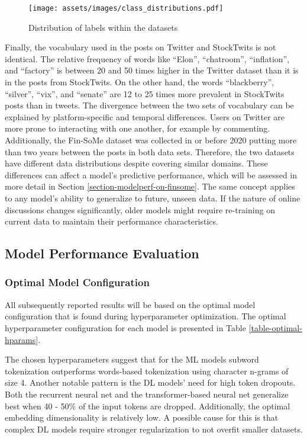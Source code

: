 \begin{figure}[!ht]
	\texttt{[image: assets/images/class\_distributions.pdf]}
	\caption{Distribution of labels within the datasets}
	\label{figure-class-distribution}
\end{figure}

Finally, the vocabulary used in the posts on Twitter and StockTwits is not identical. The relative frequency of words like ``Elon'', ``chatroom'', ``inflation'', and ``factory'' is between 20 and 50 times higher in the Twitter dataset than it is in the posts from StockTwits. On the other hand, the words ``blackberry'', ``silver'', ``vix'', and ``senate'' are 12 to 25 times more prevalent in StockTwits posts than in tweets. The divergence between the two sets of vocabulary can be explained by platform-specific and temporal differences. Users on Twitter are more prone to interacting with one another, for example by commenting. Additionally, the Fin-SoMe dataset was collected in or before 2020 putting more than two years between the posts in both data sets. Therefore, the two datasets have different data distributions despite covering similar domains. These differences can affect a model's predictive performance, which will be assessed in more detail in Section \ref{section-modelperf-on-finsome}. The same concept applies to any model's ability to generalize to future, unseen data. If the nature of online discussions changes significantly, older models might require re-training on current data to maintain their performance characteristics.

\subsection{Model Performance Evaluation}

\subsubsection{Optimal Model Configuration}
All subsequently reported results will be based on the optimal model configuration that is found during hyperparameter optimization.
The optimal hyperparameter configuration for each model is presented in Table \ref{table-optimal-hparams}. 



The chosen hyperparameters suggest that for the ML models subword tokenization outperforms words-based tokenization using character n-grams of size 4. Another notable pattern is the DL models' need for high token dropouts. Both the recurrent neural net and the transformer-based neural net generalize best when 40 - 50\% of the input tokens are dropped. Additionally, the optimal embedding dimensionality is relatively low. A possible cause for this is that complex DL models require stronger regularization to not overfit smaller datasets.





